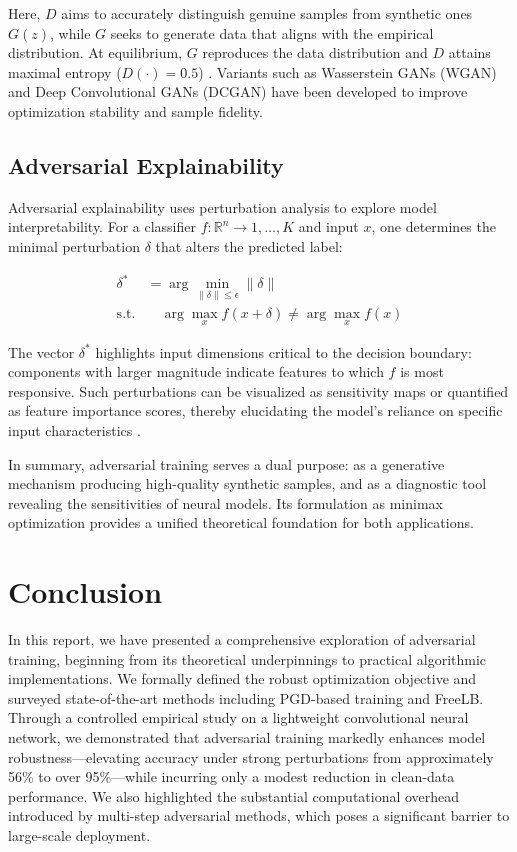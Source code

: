 \documentclass[10pt,twocolumn,letterpaper]{article}
\begin{document}
Here, $D$ aims to accurately distinguish genuine samples from synthetic ones $G(z)$, while $G$ seeks to generate data that aligns with the empirical distribution. At equilibrium, $G$ reproduces the data distribution and $D$ attains maximal entropy ($D(\cdot)=0.5$) \cite{goodfellow2014generativeadversarialnetworks}. Variants such as Wasserstein GANs (WGAN) and Deep Convolutional GANs (DCGAN) have been developed to improve optimization stability and sample fidelity.

\subsection{Adversarial Explainability}

Adversarial explainability uses perturbation analysis to explore model interpretability. For a classifier $f: \mathbb{R}^n\to{1,\dots,K}$ and input $x$, one determines the minimal perturbation $\delta$ that alters the predicted label:

$$
\begin{aligned}
\delta^* &= \arg\min_{\|\delta\|\le\epsilon} \|\delta\| \\
\text{s.t.}&\quad
\arg\max_x f(x+\delta) \neq \arg\max_x f(x)
\end{aligned}
$$

The vector $\delta^*$ highlights input dimensions critical to the decision boundary: components with larger magnitude indicate features to which $f$ is most responsive. Such perturbations can be visualized as sensitivity maps or quantified as feature importance scores, thereby elucidating the model's reliance on specific input characteristics \cite{NEURIPS2019_e2c420d9, tsipras2019robustnessoddsaccuracy}.

\medskip
In summary, adversarial training serves a dual purpose: as a generative mechanism producing high-quality synthetic samples, and as a diagnostic tool revealing the sensitivities of neural models. Its formulation as minimax optimization provides a unified theoretical foundation for both applications.

\section{Conclusion}

In this report, we have presented a comprehensive exploration of adversarial training, beginning from its theoretical underpinnings to practical algorithmic implementations. We formally defined the robust optimization objective and surveyed state-of-the-art methods including PGD-based training and FreeLB. Through a controlled empirical study on a lightweight convolutional neural network, we demonstrated that adversarial training markedly enhances model robustness—elevating accuracy under strong perturbations from approximately 56\% to over 95\%—while incurring only a modest reduction in clean-data performance. We also highlighted the substantial computational overhead introduced by multi-step adversarial methods, which poses a significant barrier to large-scale deployment.
\end{document}
